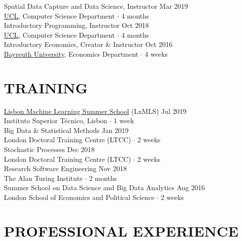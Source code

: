 \documentclass{cv}
\begin{document}
Spatial Data Capture and Data Science, Instructor \hfill Mar 2019 \\
{\color{lightgray} \href{https://www.ucl.ac.uk/}{UCL}, Computer Science Department $\cdot$ 4 months} \\

Introductory Programming, Instructor \hfill Oct 2018 \\
{\color{lightgray} \href{https://www.ucl.ac.uk/}{UCL}, Computer Science Department $\cdot$ 4 months}  \\

Introductory Economics, Creator \& Instructor \hfill Oct 2016 \\
{\color{lightgray} \href{https://www.uni-bayreuth.de/en/}{Bayreuth University}, Economics Department $\cdot$ 4 weeks} \\

\section{TRAINING}

\href{http://lxmls.it.pt/}{Lisbon Machine Learning Summer School} (LxMLS) \hfill Jul 2019 \\
{\color{lightgray} Instituto Superior Técnico, Lisbon $\cdot$ 1 week} \\

Big Data \& Statistical Methods \hfill Jan 2019  \\
{\color{lightgray} London Doctoral Training Centre (LTCC) $\cdot$ 2 weeks} \\

Stochastic Processes \hfill Dec 2018  \\
{\color{lightgray} London Doctoral Training Centre (LTCC) $\cdot$ 2 weeks} \\

Research Software Engineering \hfill Nov 2018 \\
{\color{lightgray} The Alan Turing Institute $\cdot$ 2 months} \\

Summer School on Data Science and Big Data Analytics \hfill Aug 2016 \\
{\color{lightgray} London School of Economics and Political Science $\cdot$ 2 weeks} \\

\section{PROFESSIONAL EXPERIENCE}
\end{document}
